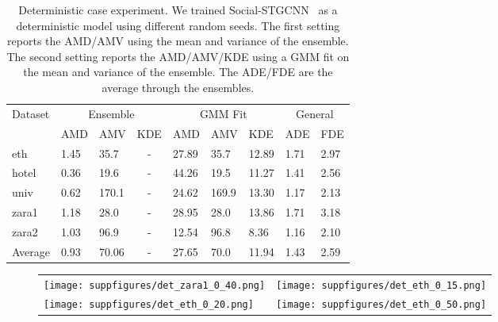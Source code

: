 \documentclass[runningheads]{llncs}
\begin{document}
\begin{table}
\centering
\scriptsize
\begin{tabular}{|l|llc||lll||ll|} 
\hline
\multirow{2}{*}{Dataset} & \multicolumn{3}{c||}{Ensemble} & \multicolumn{3}{c||}{GMM Fit} & \multicolumn{2}{c|}{General}  \\ 
\cline{2-9}
                         & AMD  & AMV   & \multicolumn{1}{l||}{KDE}    & AMD   & AMV   & KDE                                  & ADE  & FDE                    \\ 
\hline
eth                      & 1.45 & 35.7  & -                            & 27.89 & 35.7  & 12.89                                & 1.71 & 2.97                   \\
hotel                    & 0.36 & 19.6  & -                            & 44.26 & 19.5  & 11.27                                & 1.41 & 2.56                   \\
univ                     & 0.62 & 170.1 & -                            & 24.62 & 169.9 & 13.30                                & 1.17 & 2.13                   \\
zara1                    & 1.18 & 28.0  & -                            & 28.95 & 28.0  & 13.86                                & 1.71 & 3.18                   \\
zara2                    & 1.03 & 96.9  & -                            & 12.54 & 96.8  & 8.36                                 & 1.16 & 2.10                   \\ 
\cmidrule[\heavyrulewidth]{1-7}\cmidrule{8-9}\cmidrule{8-9}
Average                  & 0.93 & 70.06 & -                            & 27.65 & 70.0  & 11.94                                & 1.43 & 2.59                   \\
\hline
\end{tabular}
\caption{Deterministic case experiment. We trained Social-STGCNN~\cite{mohamed2020social} as a deterministic model using different random seeds. The first setting reports the AMD/AMV using the mean and variance of the ensemble. The second setting reports the AMD/AMV/KDE using a GMM fit on the mean and variance of the ensemble. The ADE/FDE are the average through the ensembles. }
\label{tab:social_implicit_determinsitic}
\end{table}
\begin{figure}[h]
\centering
\begin{tabular}{@{\hskip1pt}l@{\hskip1pt}l@{\hskip1pt}}
\texttt{[image: suppfigures/det\_zara1\_0\_40.png]} & \texttt{[image: suppfigures/det\_eth\_0\_15.png]}  \\
\texttt{[image: suppfigures/det\_eth\_0\_20.png]} & \texttt{[image: suppfigures/det\_eth\_0\_50.png]}  
\end{tabular}
\label{tab:social_implicit_visual_det}
\end{figure}
\end{document}
